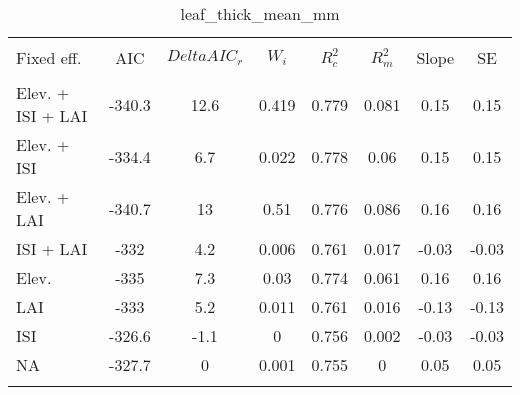 
\begin{table}[!htbp] \centering 
  \caption{leaf_thick_mean_mm} 
  \label{leaf_thick_mean_mm} 
\begin{tabular}{@{\extracolsep{5pt}} lS[table-format=3.2]S[table-format=3.2]S[table-format=3.2]S[table-format=3.2]S[table-format=3.2]S[table-format=3.2]S[table-format=3.2]} 
\\[-1.8ex]\hline 
\hline \\[-1.8ex] 
{Fixed eff.} & {AIC} & {$Delta{}AIC_r$} & {$W_i$} & {$R^2_c$} & {$R^2_m$} & {Slope} & {SE} \\
\hline \\[-1.8ex] 
Elev. + ISI + LAI & -340.3 & 12.6 & 0.419 & 0.779 & 0.081 & 0.15 & 0.15 \\ 
Elev. + ISI & -334.4 & 6.7 & 0.022 & 0.778 & 0.06 & 0.15 & 0.15 \\ 
Elev. + LAI & -340.7 & 13 & 0.51 & 0.776 & 0.086 & 0.16 & 0.16 \\ 
ISI + LAI & -332 & 4.2 & 0.006 & 0.761 & 0.017 & -0.03 & -0.03 \\ 
Elev. & -335 & 7.3 & 0.03 & 0.774 & 0.061 & 0.16 & 0.16 \\ 
LAI & -333 & 5.2 & 0.011 & 0.761 & 0.016 & -0.13 & -0.13 \\ 
ISI & -326.6 & -1.1 & 0 & 0.756 & 0.002 & -0.03 & -0.03 \\ 
NA & -327.7 & 0 & 0.001 & 0.755 & 0 & 0.05 & 0.05 \\ 
\hline \\[-1.8ex] 
\end{tabular} 
\end{table} 
